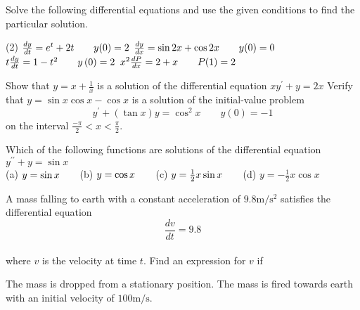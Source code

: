 \begin{Exercise}[title={Differential Equations},label=exDiffEqns]
	\Question Solve the following differential equations and use the given conditions to find the particular solution. 
	\begin{tasks}(2)
	\task $\frac{d y}{d t} =e^{t} +2 t\text{\quad \quad }y (0) =2$ %
	\task $\frac{d y}{d x} =\sin  2 x +\cos  2 x\text{\quad \quad }y (0) =0$ %
	\task $t \frac{d y}{d t} =1 -t^{2}\text{\quad \quad }y \left (0\right ) =2$ %
	\task $x^{2} \frac{d P}{d x} =2 +x\text{\quad \quad }P (1) =2$ %
	\end{tasks}

\Question Show that $y =x +\frac{1}{x}$ is a solution of the differential equation $x y^{ \prime } +y =2 x$  %
\Question Verify that $y =\sin  x \cos  x -\cos  x$ is a solution of the initial-value problem
\begin{equation*}y^{ \prime } +\left (\tan  x\right ) y =\cos ^{2} x\qquad y (0) = -1
\end{equation*} on the interval $\frac{ -\pi }{2} <x <\frac{\pi }{2}$. %

\Question Which of the following functions are solutions of the differential
equation $y^{ \prime  \prime } +y =\sin  x$ \\\relax (a)  $y =\sin  x\text{\quad \quad }$(b)  $y =\cos  x\text{\quad \quad }$(c)  $y =\frac{1}{2} x \sin  x\text{\quad \quad }$(d)  $y = -\frac{1}{2} x \cos  x$ %

\Question A mass falling to earth with a constant acceleration of $9.8 \mathrm{m}/\mathrm{s}^{2}$ satisfies the differential equation
\begin{equation*}\frac{d v}{d t} =9.8
\end{equation*} \\\relax where $v$ is the velocity at time $t$.  Find an expression for $v$ if 
\begin{tasks}
	\task The mass is dropped from a stationary position. 
	\task The mass is fired towards earth with an initial velocity of $100 \mathrm{m}/\mbox{s}\text{.}$ \end{tasks}


\end{Exercise}
